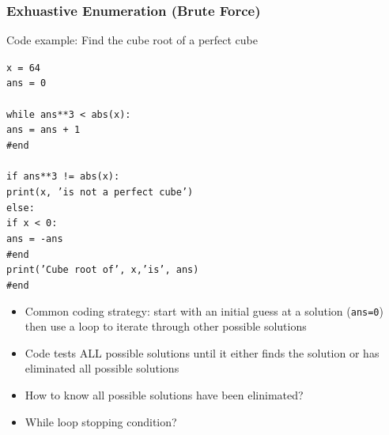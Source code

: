 \documentclass{beamer}
\newcommand{\code}[1]{\texttt{#1}}
\newcommand{\tab}{\hspace*{22pt}}
\begin{document}
\begin{frame}	
	\frametitle{Exhuastive Enumeration (Brute Force)}
	
	\begin{block}{Code example:}
			Find the cube root of a perfect cube
			
			\vspace{10pt}
			
			\begin{scriptsize}
			\code{x = 64 \\[-5pt]
			ans = 0 \\[-5pt]
			\tab \\[-5pt]
			while ans**3 < abs(x): \\[-5pt]
			\tab ans = ans + 1 \\[-5pt]
			\#end \\[-5pt]
			\tab \\[-5pt]
			if ans**3 != abs(x): \\[-5pt]
			\tab print(x, 'is not a perfect cube') \\[-5pt]
			else: \\[-5pt]
			\tab if x < 0: \\[-5pt]
			\tab \tab ans = -ans \\[-5pt]
			\tab \#end \\[-5pt]
			\tab print('Cube root of', x,'is', ans) \\[-5pt]
			\#end
			}
			\end{scriptsize}
		\endminipage\hfill
			\begin{itemize}
				\item Common coding strategy: start with an initial guess at a solution (\code{ans=0}) then use a loop to iterate through other possible solutions
				\item Code tests ALL possible solutions until it either finds the solution or has eliminated all possible solutions
				\item How to know all possible solutions have been elinimated?
				\item While loop stopping condition?
			\end{itemize}
		\endminipage\hfill
	\end{block}
	
\end{frame}
\end{document}
